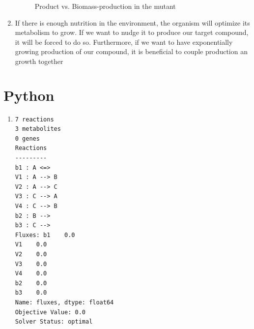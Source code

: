 \documentclass{scrartcl}
\begin{document}
\begin{enumerate}
\begin{figure}[H]
				\caption{Product vs. Biomass-production in the mutant}
			\end{figure}
		\item If there is enough nutrition in the environment, the organism will optimize its metabolism to grow. If we want to nudge it to produce our target compound, it will be forced to do so. 
			Furthermore, if we want to have exponentially growing production of our compound, it is beneficial to couple production an growth together
	\end{enumerate}
\section{Python}
	\begin{enumerate}
		\item
			\begin{lstlisting}
7 reactions
3 metabolites
0 genes
Reactions
---------
b1 : A <=>
V1 : A --> B
V2 : A --> C
V3 : C --> A
V4 : C --> B
b2 : B -->
b3 : C -->
Fluxes: b1    0.0
V1    0.0
V2    0.0
V3    0.0
V4    0.0
b2    0.0
b3    0.0
Name: fluxes, dtype: float64
Objective Value: 0.0
Solver Status: optimal
			\end{lstlisting}
	\end{enumerate}
\end{document}
